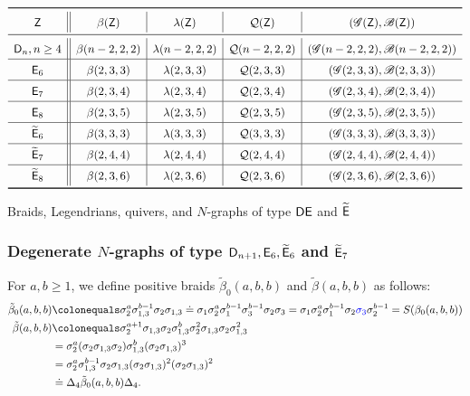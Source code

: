 \begin{table}[ht]
\[
\renewcommand\arraystretch{1.5}
\begin{array}{c||c|c|c|c}
\toprule
\dynX & \beta(\dynX) & \legendrian(\dynX) & \quiver(\dynX) & (\ngraph(\dynX), \nbasis(\dynX))\\
\midrule
\dynD_n, n\ge 4 & \beta(n-2,2,2) & \legendrian(n-2,2,2) & \quiver(n-2,2,2) & (\ngraph(n-2,2,2),\nbasis(n-2,2,2))\\
\hline
\dynE_6 & \beta(2,3,3) & \legendrian(2,3,3) & \quiver(2,3,3) & (\ngraph(2,3,3),\nbasis(2,3,3))\\
\hline
\dynE_7 & \beta(2,3,4) & \legendrian(2,3,4) & \quiver(2,3,4) & (\ngraph(2,3,4),\nbasis(2,3,4))\\
\hline
\dynE_8 & \beta(2,3,5) & \legendrian(2,3,5) & \quiver(2,3,5) & (\ngraph(2,3,5),\nbasis(2,3,5))\\
\hline
\exdynE_6 & \beta(3,3,3) & \legendrian(3,3,3) & \quiver(3,3,3) & (\ngraph(3,3,3),\nbasis(3,3,3))\\
\hline
\exdynE_7 & \beta(2,4,4) & \legendrian(2,4,4) & \quiver(2,4,4) & (\ngraph(2,4,4),\nbasis(2,4,4))\\
\hline
\exdynE_8 & \beta(2,3,6) & \legendrian(2,3,6) & \quiver(2,3,6) & (\ngraph(2,3,6),\nbasis(2,3,6))\\
\bottomrule
\end{array}
\]
\caption{Braids, Legendrians, quivers, and $N$-graphs of type $\mathsf{D}\mathsf{E}$ and $\widetilde{\mathsf{E}}$}
\label{table:short notations}
\end{table}


\subsubsection{Degenerate $N$-graphs of type $\mathsf{D}_{n+1}, \mathsf{E}_6, \widetilde{\mathsf{E}}_6$ and $\widetilde{\mathsf{E}}_7$}
For $a, b\ge 1$, we define positive braids $\tilde\beta_0(a,b,b)$ and $\tilde\beta(a,b,b)$ as follows:
\begin{align*}
\tilde\beta_0(a,b,b)&\colonequals \sigma_2^a\sigma_{1,3}^{b-1}\sigma_2\sigma_{1,3}
\mathrel{\dot{=}}\sigma_1\sigma_2^a \sigma_1^{b-1} \sigma_3^{b-1}\sigma_2\sigma_3
=\sigma_1\sigma_2^a \sigma_1^{b-1}\sigma_2{\color{blue}\sigma_3} \sigma_2^{b-1}
=S(\beta_0(a,b,b))\\
\tilde\beta(a,b,b)&\colonequals \sigma_2^{a+1}\sigma_{1,3}\sigma_2\sigma_{1,3}^{b}\sigma_2^2\sigma_{1,3}\sigma_2\sigma_{1,3}^2\\
&=\2^a(\2 \5 \2) \5^b (\2 \5)^3 \\
&=\2^a \5^{b-1} \2 \5 (\2 \5)^2 (\2 \5)^2 \\
&\mathrel{\dot{=}}\Delta_4\tilde\beta_0(a,b,b)\Delta_4.
\end{align*}


